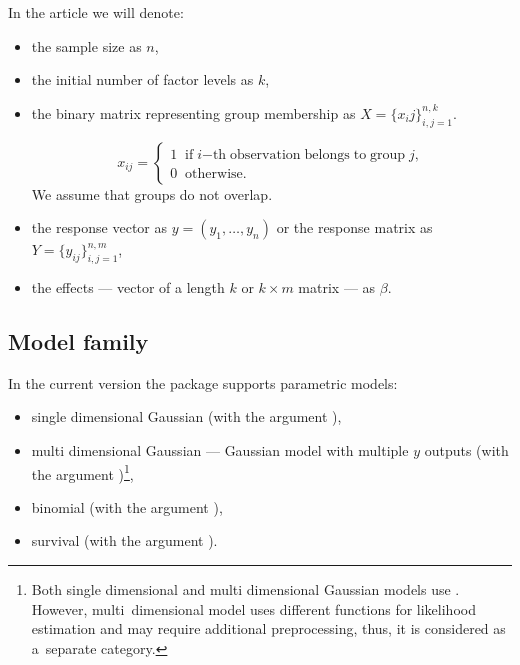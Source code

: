 In the article we will denote:
\begin{itemize}

\item the sample size as $n$,
\item the initial number of factor levels as $k$,
\item the binary matrix representing group membership as $X = \{x_ij\}_{i,j=1}^{n,k}$. 

$$
x_{ij} = \left\{
                \begin{array}{ll}
                  1\;\; \mathrm{if} \; i \mathrm{-th \;
                  observation \; belongs \; to 
                  \; group\;} j, \\
                  0 \;\; \mathrm{otherwise.} 
                \end{array}
       \right.$$
We assume that groups do not overlap.
\item the response vector as $y = (y_1, \ldots, y_n)$ or the response matrix as $Y = \{y_{ij}\}_{i,j=1}^{n,m}$,
\item the effects --- vector of a length $k$  or $k \times m$ matrix --- as $\beta$.

\end{itemize}

\break

\subsection{Model family}

In the current version the package supports parametric models: 

\begin{itemize}
\item single dimensional Gaussian (with the argument ),
\item multi dimensional Gaussian --- Gaussian model with multiple $y$ outputs (with the argument )\footnote{Both single dimensional and multi dimensional Gaussian models use . However, multi~dimensional model uses different functions for likelihood estimation and may require additional preprocessing, thus, it is considered as a~separate category.},
\item binomial (with the argument ),
\item survival (with the argument ).
\end{itemize}

